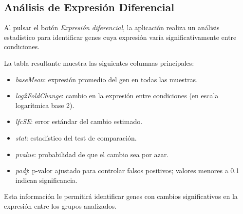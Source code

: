 \subsection{Análisis de Expresión Diferencial}

Al pulsar el botón \textit{Expresión diferencial}, la aplicación realiza un análisis estadístico para identificar genes cuya expresión varía significativamente entre condiciones.

La tabla resultante muestra las siguientes columnas principales:

\begin{itemize}
  \item \textit{baseMean}: expresión promedio del gen en todas las muestras.
  \item \textit{log2FoldChange}: cambio en la expresión entre condiciones (en escala logarítmica base 2).
  \item \textit{lfcSE}: error estándar del cambio estimado.
  \item \textit{stat}: estadístico del test de comparación.
  \item \textit{pvalue}: probabilidad de que el cambio sea por azar.
  \item \textit{padj}: p-valor ajustado para controlar falsos positivos; valores menores a 0.1 indican significancia.
\end{itemize}

Esta información le permitirá identificar genes con cambios significativos en la expresión entre los grupos analizados.


